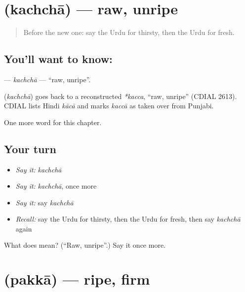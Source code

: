 \section[\texorpdfstring{\ur{کچا} (kachchā)}{کچا (kachchā)}]{ (kachchā) — raw, unripe}

\label{lesson:UR-C136-kachcha}



\begin{quote}
Before the new one: say the Urdu for thirsty, then the Urdu for fresh.
\end{quote}

\subsection*{You'll want to know: }
\textbf{} — \emph{kachchā} — \textquotedblleft{}raw, unripe\textquotedblright{}.

\begin{cousinweb}
\textbf{} (\emph{kachchā}) goes back to a reconstructed \emph{*kacca}, \textquotedblleft{}raw, unripe\textquotedblright{} (CDIAL 2613). CDIAL lists Hindi \emph{kācā} and marks \emph{kaccā} as taken over from Punjabi.
\end{cousinweb}

\begin{grammarlens}[title={What you've built}]
One more word for this chapter.
\end{grammarlens}

\subsection*{Your turn}
\begin{itemize}
\raggedright
  \item \emph{Say it:} \emph{kachchā}
  \item \emph{Say it:} \emph{kachchā}, once more
  \item \emph{Say it:} say \emph{kachchā}
  \item \emph{Recall:} say the Urdu for thirsty, then the Urdu for fresh, then say \emph{kachchā} again
\end{itemize}

\begin{tcolorbox}[breakable,colback=teal!4,colframe=teal!35!black,title={Before you move on}]
What does  mean? (\textquotedblleft{}Raw, unripe\textquotedblright{}.) Say it once more.
\end{tcolorbox}
\section[\texorpdfstring{\ur{پکا} (pakkā)}{پکا (pakkā)}]{ (pakkā) — ripe, firm}

